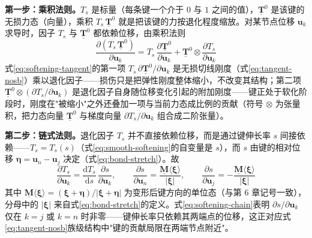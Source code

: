 \textbf{第一步：乘积法则。}$T_{s}$ 是标量（每条键一个介于 $0$ 与 $1$ 之间的值），$\underline{\mathbf{T}}^{0}$ 是该键的无损力态（向量），乘积 $T_{s}\,\underline{\mathbf{T}}^{0}$ 就是把该键的力按退化程度缩放。对某节点位移 $\mathbf{u}_{k}$ 求导时，因子 $T_{s}$ 与 $\underline{\mathbf{T}}^{0}$ 都依赖位移，由乘积法则
\begin{equation}
  \frac{\partial(T_{s}\,\underline{\mathbf{T}}^{0})}{\partial\mathbf{u}_{k}}
  =T_{s}\,\frac{\partial\underline{\mathbf{T}}^{0}}{\partial\mathbf{u}_{k}}
  +\underline{\mathbf{T}}^{0}\otimes\frac{\partial T_{s}}{\partial\mathbf{u}_{k}}
  \label{eq:softening-tangent}
\end{equation}
式\eqref{eq:softening-tangent}的第一项 $T_{s}\,\partial\underline{\mathbf{T}}^{0}/\partial\mathbf{u}_{k}$ 是无损切线刚度（式\eqref{eq:tangent-nosb}）乘以退化因子——损伤只是把弹性刚度整体缩小，不改变其结构；第二项 $\underline{\mathbf{T}}^{0}\otimes(\partial T_{s}/\partial\mathbf{u}_{k})$ 是退化因子自身随位移变化引起的附加刚度——键正处于软化阶段时，刚度在"被缩小"之外还叠加一项与当前力态成比例的贡献（符号 $\otimes$ 为张量积，把力态向量 $\underline{\mathbf{T}}^{0}$ 与梯度向量 $\partial T_{s}/\partial\mathbf{u}_{k}$ 组合成二阶张量）。

\textbf{第二步：链式法则。}退化因子 $T_{s}$ 并不直接依赖位移，而是通过键伸长率 $s$ 间接依赖——$T_{s}=T_{s}(s)$（式\eqref{eq:smooth-softening}的自变量是 $s$），而 $s$ 由键的相对位移 $\boldsymbol{\eta}=\mathbf{u}_n-\mathbf{u}_j$ 决定（式\eqref{eq:bond-stretch}）。故
\begin{equation}
  \frac{\partial T_{s}}{\partial\mathbf{u}_{k}}
  =\frac{\mathrm{d}T_{s}}{\mathrm{d}s}\,\frac{\partial s}{\partial\mathbf{u}_{k}},
  \qquad
  \frac{\partial s}{\partial\mathbf{u}_{n}}=\frac{\underline{\mathbf{M}}\langle\boldsymbol{\xi}\rangle}{|\boldsymbol{\xi}|},\qquad
  \frac{\partial s}{\partial\mathbf{u}_{j}}=-\frac{\underline{\mathbf{M}}\langle\boldsymbol{\xi}\rangle}{|\boldsymbol{\xi}|}
  \label{eq:softening-chain}
\end{equation}
其中 $\underline{\mathbf{M}}\langle\boldsymbol{\xi}\rangle=(\boldsymbol{\xi}+\boldsymbol{\eta})/|\boldsymbol{\xi}+\boldsymbol{\eta}|$ 为变形后键方向的单位态（与第 6 章记号一致），分母中的 $|\boldsymbol{\xi}|$ 来自式\eqref{eq:bond-stretch}的定义。式\eqref{eq:softening-chain}表明 $\partial s/\partial\mathbf{u}_{k}$ 仅在 $k=j$ 或 $k=n$ 时非零——键伸长率只依赖其两端点的位移，这正对应式\eqref{eq:tangent-nosb}族级结构中"键的贡献局限在两端节点附近"。

